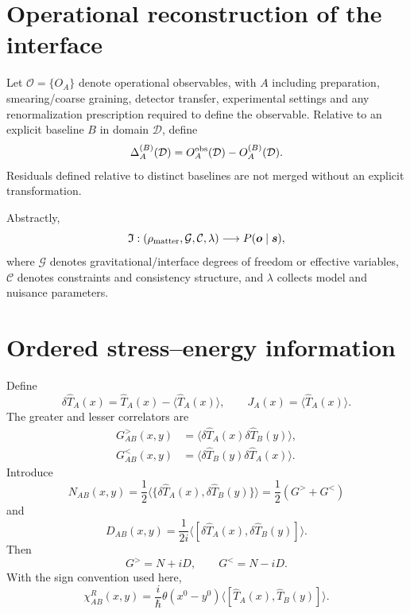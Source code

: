\documentclass[12pt]{article}
\begin{document}
\section{Operational reconstruction of the interface}

Let $\mathcal O=\{O_A\}$ denote operational observables, with $A$ including preparation, smearing/coarse graining, detector transfer, experimental settings and any renormalization prescription required to define the observable. Relative to an explicit baseline $B$ in domain $\mathcal D$, define
\begin{equation}
 \Delta_A^{(B)}(\mathcal D)
 =O_A^{\rm obs}(\mathcal D)-O_A^{(B)}(\mathcal D).
\end{equation}
Residuals defined relative to distinct baselines are not merged without an explicit transformation.

Abstractly,
\begin{equation}
 \mathfrak I:(\rho_{\rm matter},\mathcal G,\mathcal C,\lambda)
 \longrightarrow P(\bm{o}\mid\bm{s}),
\end{equation}
where $\mathcal G$ denotes gravitational/interface degrees of freedom or effective variables, $\mathcal C$ denotes constraints and consistency structure, and $\lambda$ collects model and nuisance parameters.

\section{Ordered stress--energy information}

Define
\begin{equation}
 \delta\hat T_A(x)=\hat T_A(x)-\langle\hat T_A(x)\rangle,
 \qquad
 J_A(x)=\langle\hat T_A(x)\rangle.
\end{equation}
The greater and lesser correlators are
\begin{align}
 G^>_{AB}(x,y)&=\langle\delta\hat T_A(x)\delta\hat T_B(y)\rangle,\\
 G^<_{AB}(x,y)&=\langle\delta\hat T_B(y)\delta\hat T_A(x)\rangle.
\end{align}
Introduce
\begin{equation}
 N_{AB}(x,y)=\frac12\langle\{\delta\hat T_A(x),\delta\hat T_B(y)\}\rangle
 =\frac12(G^>+G^<)
\end{equation}
and
\begin{equation}
 D_{AB}(x,y)=\frac{1}{2i}\langle[\delta\hat T_A(x),\delta\hat T_B(y)]\rangle.
\end{equation}
Then
\begin{equation}
 G^>=N+iD,\qquad G^<=N-iD.
\end{equation}
With the sign convention used here,
\begin{equation}
 \chi^R_{AB}(x,y)=\frac{i}{\hbar}\theta(x^0-y^0)
 \langle[\hat T_A(x),\hat T_B(y)]\rangle.
\end{equation}
\end{document}
